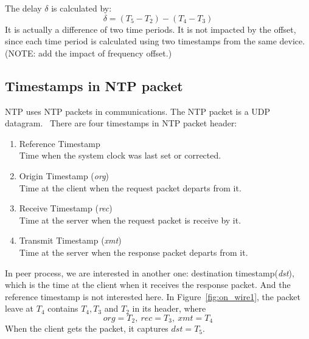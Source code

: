 The delay $\delta$ is calculated by:
\begin{equation}
    \delta = (T_5 - T_2) - (T_4 - T_3)
    \label{eq:delay_def}
\end{equation}
It is actually a difference of two time periods. It is not impacted by the
offset, since each time period is calculated using two timestamps from the same
device.
(NOTE: add the impact of frequency offset.)

\subsection{Timestamps in NTP packet}%
\label{sub:timestamps_in_ntp_packet}
NTP uses NTP packets in communications. The NTP packet is a UDP
datagram.~\cite{rfc5905} There are four timestamps in NTP packet header:
\begin{enumerate}
    \item Reference Timestamp\\
        Time when the system clock was last set or corrected.
    \item Origin Timestamp (\emph{org})\\
        Time at the client when the request packet departs from it.
    \item Receive Timestamp (\emph{rec})\\
        Time at the server when the request packet is receive by it.
    \item Transmit Timestamp (\emph{xmt})\\
        Time at the server when the response packet departs from it.
\end{enumerate}
In peer process, we are interested in another one: destination
timestamp(\emph{dst}), which is the time at the client when it receives the
response packet. And the reference timestamp is not interested here. In
Figure~\ref{fig:on_wire1}, the packet leave at $T_4$ contains $T_4, T_3$ and
$T_2$ in its header, where
$$ org = T_2,~rec = T_3,~xmt = T_4 $$
When the client gets the packet, it captures $dst = T_5$.

